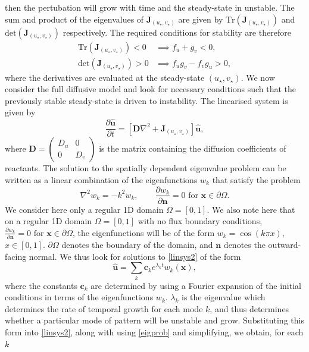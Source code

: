 then the pertubation will grow with time and the steady-state in unstable. The sum and product of the eigenvalues of $\textbf{J}_{(u_\star,v_\star)}$
are given by $\text{Tr}(\textbf{J}_{(u_\star,v_\star)})$ and $\text{det}(\textbf{J}_{(u_\star,v_\star)})$ respectively. The required conditions for stability are therefore
\begin{equation}\label{cond1}
    \begin{split}
\text{Tr}(\textbf{J}_{(u_\star,v_\star)})<0 &\implies f_u+g_v<0, \\
\text{det}(\textbf{J}_{(u_\star,v_\star)})>0 &\implies f_ug_v-f_vg_u>0,
\end{split}
\end{equation}
where the derivatives are evaluated at the steady-state $(u_\star,v_\star)$.
We now consider the full diffusive model and look for necessary conditions such that the previously stable steady-state is driven to instability. The linearised system is given by
\begin{equation}\label{linsys2}
    \frac{\partial \hat{\textbf{u}}}{\partial t}=\left[\textbf{D}\nabla^2+\textbf{J}_{(u_\star,v_\star)} \right]\hat{\textbf{u}},
\end{equation}
where $\textbf{D}=\begin{pmatrix}D_u&0\\0&D_v\end{pmatrix}$ is the matrix containing the diffusion coefficients of reactants.
The solution to the spatially dependent eigenvalue problem can be written as a linear combination of the eigenfunctions $w_k$ that satisfy the problem
\begin{equation}\label{eigprob}
\nabla^2w_k=-k^2w_k,\quad \quad \frac{\partial w_k}{\partial \textbf{n}}=0\text{ for } \textbf{x}\in\partial\Omega.
\end{equation}
We consider here only a regular 1D domain $\Omega=[0,1]$. We also note here that on a regular 1D domain $\Omega=[0,1]$ with no flux boundary conditions, $\frac{\partial w_k}{\partial \textbf{n}}=0\text{ for } \textbf{x}\in\partial\Omega$, the eigenfunctions will be of the form $w_k=\cos(k\pi x)$, $x\in[0,1]$. $\partial\Omega$ denotes the boundary of the domain, and $\textbf{n}$ denotes the outward-facing normal.
We thus look for solutions to \eqref{linsys2} of the form
\begin{equation}\label{perturbgrow}
    \hat{\textbf{u}}=\sum_k \textbf{c}_ke^{\lambda_k t}w_k(\textbf{x}),
\end{equation}
where the constants $\textbf{c}_k$ are determined by using a Fourier expansion of the initial conditions in terms of the eigenfunctions $w_k$. $\lambda_k$ is the eigenvalue which determines the rate of temporal growth for each mode $k$, and thus determines whether a particular mode of pattern will be unstable and grow. Substituting this form into \eqref{linsys2}, along with using \eqref{eigprob} and simplifying, we obtain, for each $k$
